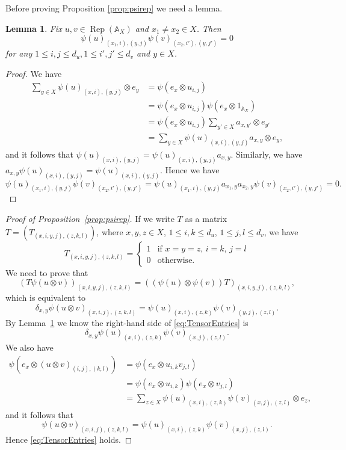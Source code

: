 \documentclass[12pt, a4paper]{amsart}
\def\Rep{\operatorname{Rep}}
\def\A{\mathbb{A}}
\newtheorem{lemma}[thm]{Lemma}
\theoremstyle{definition}
\theoremstyle{remark}
\numberwithin{equation}{section}
\begin{document}
Before proving Proposition \ref{prop:psirep} we need a lemma. 

\begin{lemma} \label{lemma:orthogpsi}
	Fix $u,v \in\Rep(\A_X)$ and $x_1\neq x_2\in X$. Then
	\[
	\psi(u)_{(x_1,i),(y,j)}\psi(v)_{(x_2,i'),(y,j')} = 0
	\]
	for any $1\leq i,j \leq d_u, 1\leq i',j'\leq d_v$ and $y\in X$.
\end{lemma}

\begin{proof}
	We have 
	\begin{align*}
		\sum_{y\in X}\psi(u)_{(x,i),(y,j)}\otimes e_y &= \psi(e_x\otimes u_{i,j}) \\
		&= \psi(e_x\otimes u_{i,j})\psi(e_x\otimes 1_{\A_X}) \\
		&= \psi(e_x\otimes u_{i,j})\sum_{y'\in X}a_{x,y'}\otimes e_{y'}\\
		&= \sum_{y\in X}\psi(u)_{(x,i),(y,j)}a_{x,y}\otimes e_y,
	\end{align*}
	and it follows that $\psi(u)_{(x,i),(y,j)}=\psi(u)_{(x,i),(y,j)}a_{x,y}$. Similarly, we have $a_{x,y}\psi(u)_{(x,i),(y,j)}=\psi(u)_{(x,i),(y,j)}$. Hence we have 
	\[
	\psi(u)_{(x_1,i),(y,j)}\psi(v)_{(x_2,i'),(y,j')} = \psi(u)_{(x_1,i),(y,j)} a_{x_1,y} a_{x_2,y} \psi(v)_{(x_2,i'),(y,j')} = 0.
	\]
\end{proof}


\begin{proof}[Proof of Proposition~\ref{prop:psirep}]
	If we write $T$ as a matrix $T=(T_{(x,i,y,j),(z,k,l)})$, where $x,y,z\in X$, $1\le i,k\le d_u$, $1\le j,l\le d_v$,  we have
	\[
	T_{(x,i,y,j),(z,k,l)}=\begin{cases} 1 & \text{if $x=y=z$, $i=k$, $j=l$}\\ 0 &\text{otherwise.}\end{cases}
	\]
	We need to prove that 
	\[
	(T\psi(u\otimes v))_{(x,i,y,j),(z,k,l)}=((\psi(u)\otimes\psi(v))T)_{(x,i,y,j),(z,k,l)},
	\]
	which is equivalent to 
	\begin{equation}\label{eq:TensorEntries}
		\delta_{x,y}\psi(u\otimes v)_{(x,i,j),(z,k,l)}=\psi(u)_{(x,i),(z,k)}\psi(v)_{(y,j),(z,l)}.
	\end{equation}
	By Lemma~\ref{lemma:orthogpsi} we know the right-hand side of \eqref{eq:TensorEntries} is
	\[
	\delta_{x,y}\psi(u)_{(x,i),(z,k)}\psi(v)_{(x,j),(z,l)}.
	\]
	We also have  
	\begin{align*}
		\psi(e_x\otimes (u\otimes v)_{(i,j),(k,l)}) &= \psi(e_x\otimes u_{i,k}v_{j,l})\\
		&= \psi(e_x\otimes u_{i,k})\psi(e_x\otimes v_{j,l})\\
		&= \sum_{z\in X}\psi(u)_{(x,i),(z,k)}\psi(v)_{(x,j),(z,l)}\otimes e_z,
	\end{align*}
	and it follows that 
	\[
	\psi(u\otimes v)_{(x,i,j),(z,k,l)}=\psi(u)_{(x,i),(z,k)}\psi(v)_{(x,j),(z,l)}.
	\]
	Hence \eqref{eq:TensorEntries} holds.
\end{proof}
\end{document}
